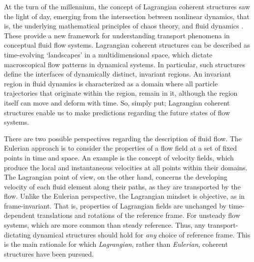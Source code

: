 At the turn of the millennium, the concept of Lagrangian coherent structures
saw the light of day, emerging from the intersection between nonlinear dynamics,
that is, the underlying mathematical principles of chaos theory, and fluid
dynamics \parencite{haller2000lagrangian}. These provide a new framework for
understanding transport phenomena in conceptual fluid flow systems. Lagrangian
coherent structures can be described as time-evolving `landscapes' in a
multidimensional space, which dictate macroscopical flow patterns in dynamical
systems. In particular, such structures define the interfaces of dynamically
distinct, invariant regions. An invariant region in fluid dynamics is
characterized as a domain where all particle trajectories that originate within
the region, remain in it, although the region itself can move and deform with
time. So, simply put; Lagrangian coherent structures enable us to make
predictions regarding the future states of flow systems.

There are two possible perspectives regarding the description of fluid flow.
The Eulerian approach is to consider the properties of a flow field at a set of
fixed points in time and space. An example is the concept of velocity fields,
which produce the local and instantaneous velocities at all points within their
domains. The Lagrangian point of view, on the other hand, concerns the
developing velocity of each fluid element along their paths, as they are
transported by the flow. Unlike the Eulerian perspective, the Lagrangian
mindset is objective, as in frame-invariant. That is, properties of Lagrangian
fields are unchanged by time-dependent translations and rotations of the
reference frame. For unsteady flow systems, which are more common than steady
reference. Thus, any transport-dictating dynamical structures should
hold for \emph{any} choice of reference frame. This is the main
rationale for which \emph{Lagrangian}, rather than \emph{Eulerian}, coherent
structures have been pursued.

